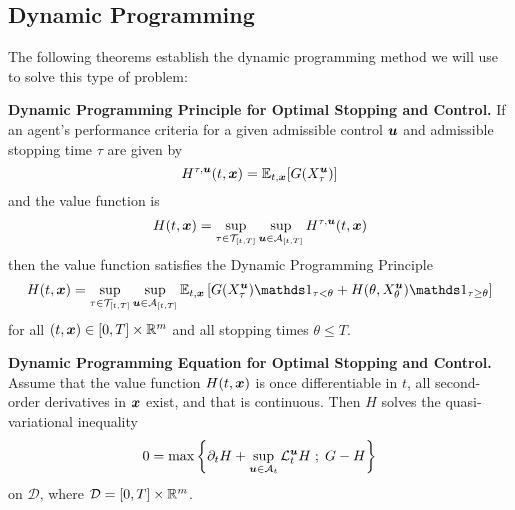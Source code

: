 \subsection{Dynamic Programming}
The following theorems establish the dynamic programming method we will use to solve this type of problem:
\begin{thm} \textbf{Dynamic Programming Principle for Optimal Stopping and Control.}
If an agent's performance criteria for a given admissible control $\bm{u}$ and admissible stopping time $\tau$ are given by
\[ H^{\tau, \bm{u}}(t,\bm{x}) = \mathbb{E}_{t,\bm{x}} [ G (X^{\bm{u}}_\tau)] \]
and the value function is
\[ H(t,\bm{x}) = \sup\limits_{\tau \in \mathcal{T}_{[t,T]}} \sup\limits_{\bm{u} \in \mathcal{A}_{[t,T]}} H^{\tau, \bm{u}}(t,\bm{x}) \]
then the value function satisfies the Dynamic Programming Principle
\begin{equation}\label{eq:thmDPP}
H(t,\bx) = \sup\limits_{\tau \in \mathcal{T}_{[t,T]}} \sup\limits_{\bu \in \cA_{[t,T]}} \E_{t,\bx} \left[ G (X^{\bu}_\tau) \indicator_{\tau<\theta} + H(\theta, X^{\bu}_\theta)\indicator_{\tau \geq \theta} \right]
\end{equation}
for all $(t,\bm{x}) \in [0,T] \times \mathbb{R}^m$ and all stopping times $\theta \leq T$.
\end{thm}
\begin{thm} \textbf{Dynamic Programming Equation for Optimal Stopping and Control.}
Assume that the value function $H(t,\bm{x})$ is once differentiable in $t$, all second-order derivatives in $\bm{x}$ exist, and that  is continuous. Then $H$ solves the quasi-variational inequality
\begin{equation}\label{eq:thmDPE}
0 = \max \left\lbrace \partial_t H + \sup \limits_{\bm{u} \in \mathcal{A}_t} \mathcal{L}^{\bm{u}}_t H \; ; \; G - H \right\rbrace
\end{equation}
on $\mathcal{D}$, where $\mathcal{D} = [0,T] \times \mathbb{R}^m$.
\end{thm}

